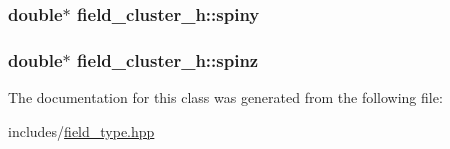 \subsubsection[{\texorpdfstring{spiny}{spiny}}]{\setlength{\rightskip}{0pt plus 5cm}double$\ast$ field\+\_\+cluster\+\_\+h\+::spiny\hspace{0.3cm}{\ttfamily [protected]}}\hypertarget{classfield__cluster__h_a1e9cb39e831864b2b0740fc4acb2106e}{}\label{classfield__cluster__h_a1e9cb39e831864b2b0740fc4acb2106e}
\subsubsection[{\texorpdfstring{spinz}{spinz}}]{\setlength{\rightskip}{0pt plus 5cm}double$\ast$ field\+\_\+cluster\+\_\+h\+::spinz\hspace{0.3cm}{\ttfamily [protected]}}\hypertarget{classfield__cluster__h_a11fa69cd080ca9d066fcf90f194ff3ef}{}\label{classfield__cluster__h_a11fa69cd080ca9d066fcf90f194ff3ef}


The documentation for this class was generated from the following file\+:\begin{DoxyCompactItemize}
\item 
includes/\hyperlink{field__type_8hpp}{field\+\_\+type.\+hpp}\end{DoxyCompactItemize}
